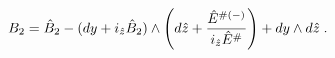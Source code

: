 \begin{equation}\label{TBsg}
{{B}}_2=  \hat{{B}}_2 -
(dy + i_{\hat{z}} \hat{B}_2) \wedge
\left(d\hat{z}+ {\hat{E}^{ {\#}(-)}
\over i_{\hat{z}}\hat{E}^{ {\#}}}\right) + dy \wedge d\hat{z}\; .   
\end{equation} 
